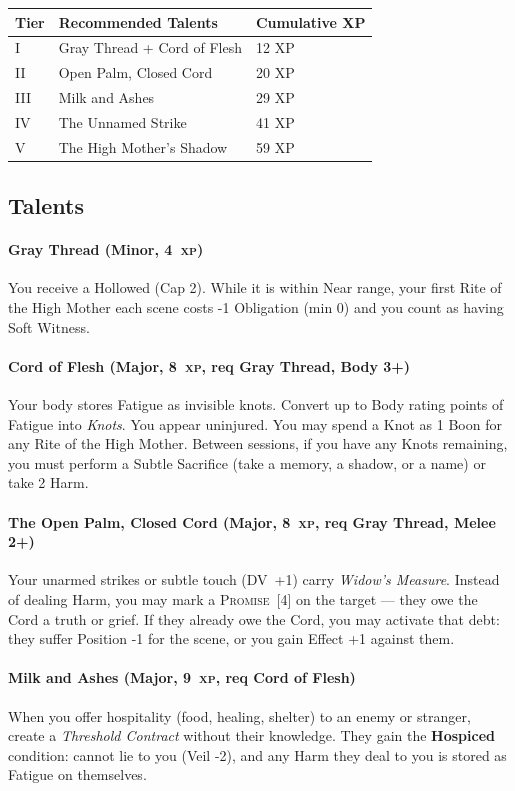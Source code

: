 \documentclass[10pt,twoside]{book}
\newcommand{\dv}[1]{\textsc{DV}~#1}
\newcommand{\xp}[1]{#1~\textsc{xp}}
\newcommand{\timer}[2]{\textsc{#1}~[#2]}
\begin{document}
\begin{tabular}{@{}lll@{}}
\toprule
\textbf{Tier} & \textbf{Recommended Talents} & \textbf{Cumulative XP} \\
\midrule
I & Gray Thread + Cord of Flesh & 12 XP \\
II & Open Palm, Closed Cord & 20 XP \\
III & Milk and Ashes & 29 XP \\
IV & The Unnamed Strike & 41 XP \\
V & The High Mother's Shadow & 59 XP \\
\bottomrule
\end{tabular}

\subsection*{Talents}

\paragraph{Gray Thread (Minor, \xp{4})}
You receive a Hollowed (Cap 2). While it is within Near range, your first Rite of the High Mother each scene costs -1 Obligation (min 0) and you count as having Soft Witness.

\paragraph{Cord of Flesh (Major, \xp{8}, req Gray Thread, Body 3+)}
Your body stores Fatigue as invisible knots. Convert up to Body rating points of Fatigue into \textit{Knots}. You appear uninjured. You may spend a Knot as 1 Boon for any Rite of the High Mother. Between sessions, if you have any Knots remaining, you must perform a Subtle Sacrifice (take a memory, a shadow, or a name) or take 2 Harm.

\paragraph{The Open Palm, Closed Cord (Major, \xp{8}, req Gray Thread, Melee 2+)}
Your unarmed strikes or subtle touch (\dv{+1}) carry \textit{Widow's Measure}. Instead of dealing Harm, you may mark a \timer{Promise}{4} on the target --- they owe the Cord a truth or grief. If they already owe the Cord, you may activate that debt: they suffer Position -1 for the scene, or you gain Effect +1 against them.

\paragraph{Milk and Ashes (Major, \xp{9}, req Cord of Flesh)}
When you offer hospitality (food, healing, shelter) to an enemy or stranger, create a \textit{Threshold Contract} without their knowledge. They gain the \textbf{Hospiced} condition: cannot lie to you (Veil -2), and any Harm they deal to you is stored as Fatigue on themselves.
\end{document}
